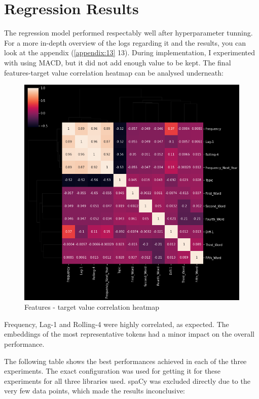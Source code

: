 \documentclass[12pt,MSc,a4paper,oneside]{muthesis}
\begin{document}
    \section{Regression Results}
    The regression model performed respectably well after hyperparameter tunning. For a more in-depth overview of the logs regarding it and the results, you can look at the appendix (\ref{appendix:13} 13).
    During implementation, I experimented with using MACD, but it did not add enough value to be kept. The final features-target value correlation heatmap can be analysed underneath:
    \begin{figure}[h]
      \centering
      \includegraphics[scale=0.25]{regression_features_corellation.png}
      \caption{Features - target value correlation heatmap}
    \end{figure}

    Frequency, Lag-1 and Rolling-4 were highly correlated, as expected. The embeddings of the most representative tokens had a minor impact on the overall performance.

    The following table shows the best performances achieved in each of the three experiments. The exact configuration was used for getting it for these experiments for all three libraries used. spaCy was excluded directly due to the very few data points, which made the results inconclusive:
\end{document}
